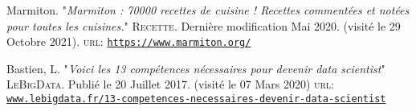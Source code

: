 \begin{thebibliography}{100}

\addtolength{\leftmargin}{0.2in}
\setlength{\itemindent}{-0.2in}

 Marmiton. "\emph{Marmiton : 70000 recettes de cuisine ! Recettes commentées et notées pour toutes les cuisines.}" \textsc{Recette}. Dernière modification Mai 2020. (visité le 29 Octobre 2021). \textsc{url:} \href{https://www.marmiton.org/}{\texttt{\url{https://www.marmiton.org/}}}

 Bastien, L. "\emph{Voici les 13 compétences nécessaires pour devenir data scientist}" \textsc{LeBigData}. Publié le 20 Juillet 2017. (visité le 07 Mars 2020) \textsc{url:} \href{http:/www.lebigdata.fr/13-competences-necessaires-devenir-data-scientist}{\texttt{\url{www.lebigdata.fr/13-competences-necessaires-devenir-data-scientist}}}

\end{thebibliography}